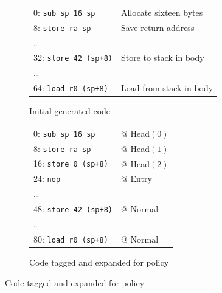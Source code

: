 \documentclass{report}
\begin{document}
\begin{figure}
  \begin{subfigure}[t]{0.55\textwidth}
    \vspace{0em}
    \begin{tabular}{l l}
      0: {\tt sub sp 16 sp} & Allocate sixteen bytes \\
      8: {\tt store ra sp} & Save return address \\
      \dots \\
      32: {\tt store 42 (sp+8)} & Store to stack in body \\
      \dots \\
      64: {\tt load r0 (sp+8)} & Load from stack in body \\
    \end{tabular}
    \caption{Initial generated code}
    \label{ex:call1}
  \end{subfigure}
  \begin{subfigure}[t]{0.45\textwidth}
    \vspace{0em}
    \begin{tabular}{l l}
      0: {\tt sub sp 16 sp} & @ {\sc Head}\((0)\) \\
      8: {\tt store ra sp} & @ {\sc Head}\((1)\) \\
      16: {\tt store 0 (sp+8)} & @ {\sc Head}\((2)\) \\
      24: {\tt nop} & @ {\sc Entry} \\
      \dots \\
      48: {\tt store 42 (sp+8)} & @ {\sc Normal} \\
      \dots \\
      80: {\tt load r0 (sp+8)} & @ {\sc Normal} \\
    \end{tabular}
    \caption{Code tagged and expanded for policy}
    \label{ex:call2}
  \end{subfigure}

  \vspace{\belowdisplayskip}
  

\end{figure}
\end{document}

